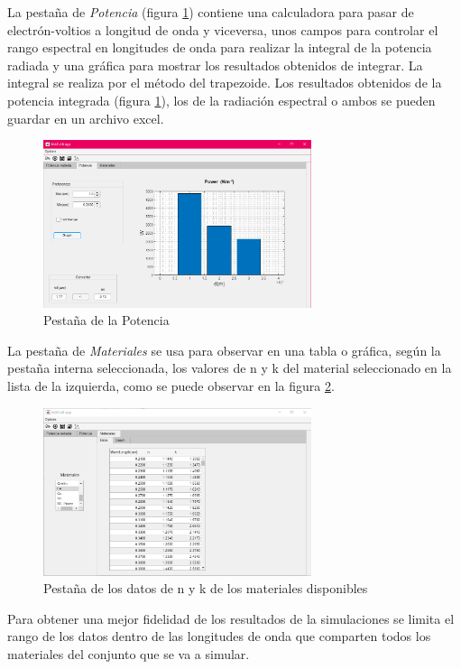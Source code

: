 La pestaña de \textit{Potencia} (figura \ref{fig:pestana_Potencia}) contiene una calculadora para pasar de electrón-voltios a longitud de onda y viceversa, unos campos para controlar el rango espectral en longitudes de onda para realizar la integral de la potencia radiada y una gráfica para mostrar los resultados obtenidos de integrar. La integral se realiza por el método del trapezoide. Los resultados obtenidos de la potencia integrada (figura \ref{fig:pestana_Potencia}), los de la radiación espectral o ambos se pueden guardar en un archivo excel.
\begin{figure}[H]
	\centering
		\includegraphics[width=0.70\textwidth]{figuras/pestana_Potencia.png}
	\caption{Pestaña de la Potencia}
	\label{fig:pestana_Potencia}
\end{figure}
La pestaña de \textit{Materiales} se usa para observar en una tabla o gráfica, según la pestaña interna seleccionada, los valores de n y k del material seleccionado en la lista de la izquierda, como se puede observar en la figura \ref{fig:pestana_materiales}.
\begin{figure}[H]
	\centering
		\includegraphics[width=0.70\textwidth]{figuras/pestana_materiales.png}
	\caption{Pestaña de los datos de n y k  de los materiales disponibles}
	\label{fig:pestana_materiales}
\end{figure}
Para obtener una mejor fidelidad de los resultados de la simulaciones se limita el rango de los datos dentro de las longitudes de onda que comparten todos los materiales del conjunto que se va a simular.